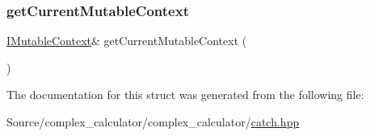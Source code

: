 \mbox{\label{struct_catch_1_1_i_mutable_context_aea4b25692aaf4397cdf630716976f6b8}} 
\subsubsection{\texorpdfstring{get\+Current\+Mutable\+Context}{getCurrentMutableContext}}
{\footnotesize\ttfamily \mbox{\hyperlink{struct_catch_1_1_i_mutable_context}{I\+Mutable\+Context}}\& get\+Current\+Mutable\+Context (\begin{DoxyParamCaption}{ }\end{DoxyParamCaption})\hspace{0.3cm}{\ttfamily [friend]}}



The documentation for this struct was generated from the following file\+:\begin{DoxyCompactItemize}
\item 
Source/complex\+\_\+calculator/complex\+\_\+calculator/\mbox{\hyperlink{catch_8hpp}{catch.\+hpp}}\end{DoxyCompactItemize}
